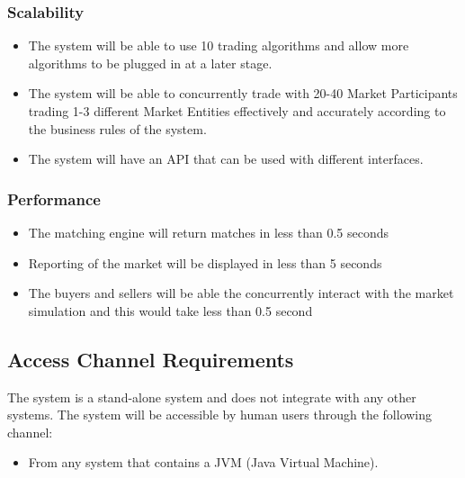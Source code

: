 \documentclass[12pt]{article}
\begin{document}
			    	\subsubsection{Scalability}
			    	\begin{itemize}
			    		\item The system will be able to use 10 trading algorithms and allow more algorithms to be plugged in at a later stage.
                                        \item The system will be able to concurrently trade with 20-40 Market Participants trading 1-3 different Market Entities effectively and accurately according to the business rules of the system.
                                        \item The system will have an API that can be used with different interfaces. 
                                \end{itemize}
			    	
			    	\subsubsection{Performance}
			    	\begin{itemize}
			    		\item The matching engine will return matches in less than 0.5 seconds
                                        \item Reporting of the market will be displayed in less than 5 seconds
                                        \item The buyers and sellers will be able the concurrently interact with the market simulation and this would take less than 0.5 second
                                \end{itemize} 
			    	    		
                            \subsection{Access Channel Requirements}
                                 The system is a stand-alone system and does not integrate with any other systems.
                                 The system will be accessible by human users through the following channel:
                                         \begin{itemize}
                                             \item From any system that contains a JVM (Java Virtual Machine).
                                         \end{itemize}
			   			
\end{document}

